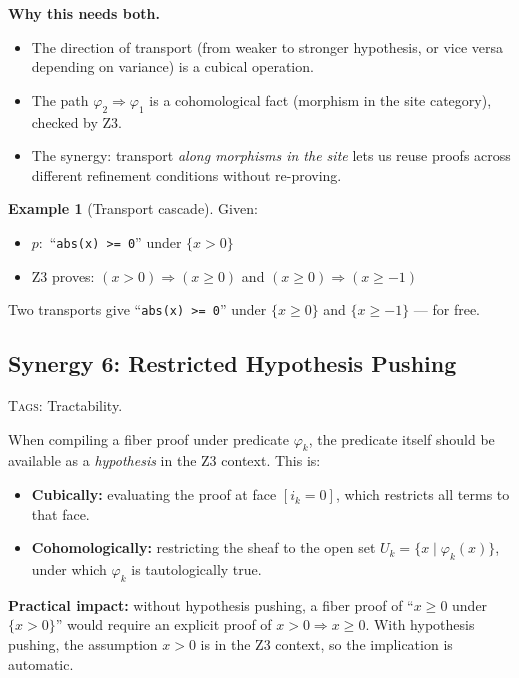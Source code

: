 \documentclass[11pt,a4paper]{article}
\theoremstyle{definition}
\newtheorem{example}[definition]{Example}
\theoremstyle{plain}
\begin{document}
\textbf{Why this needs both.}
\begin{itemize}
\item The direction of transport (from weaker to stronger hypothesis,
  or vice versa depending on variance) is a cubical operation.
\item The path $\varphi_2 \Rightarrow \varphi_1$ is a cohomological
  fact (morphism in the site category), checked by Z3.
\item The synergy: transport \emph{along morphisms in the site}
  lets us reuse proofs across different refinement conditions
  without re-proving.
\end{itemize}

\begin{example}[Transport cascade]
Given:
\begin{itemize}
\item $p : $ ``\texttt{abs(x) >= 0}'' under $\{x > 0\}$
\item Z3 proves: $(x > 0) \Rightarrow (x \geq 0)$ and
  $(x \geq 0) \Rightarrow (x \geq -1)$
\end{itemize}
Two transports give ``\texttt{abs(x) >= 0}'' under $\{x \geq 0\}$
and $\{x \geq -1\}$ --- for free.
\end{example}


\subsection{Synergy 6: Restricted Hypothesis Pushing}
\label{sec:syn-hypothesis}

\textsc{Tags:} Tractability.

\medskip\noindent
When compiling a fiber proof under predicate $\varphi_k$, the
predicate itself should be available as a \emph{hypothesis} in the
Z3 context.  This is:

\begin{itemize}
\item \textbf{Cubically:} evaluating the proof at face $[i_k = 0]$,
  which restricts all terms to that face.
\item \textbf{Cohomologically:} restricting the sheaf to the open
  set $U_k = \{x \mid \varphi_k(x)\}$, under which $\varphi_k$
  is tautologically true.
\end{itemize}

\textbf{Practical impact:} without hypothesis pushing, a fiber proof
of ``$x \geq 0$ under $\{x > 0\}$'' would require an explicit
proof of $x > 0 \Rightarrow x \geq 0$.  With hypothesis pushing,
the assumption $x > 0$ is in the Z3 context, so the implication
is automatic.
\end{document}
